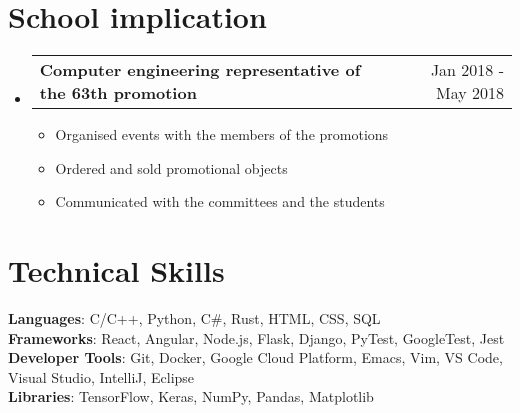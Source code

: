 \documentclass[letterpaper,11pt]{article}
\makeatletter
\newcommand{\resumeItem}[1]{
  \item\small{
    {#1}
  }
}
\newcommand{\resumeProjectHeading}[2]{
    \item
    \begin{tabular*}{0.97\textwidth}{l@{\extracolsep{\fill}}r}
      \small\textbf{#1} & #2 \\
    \end{tabular*}
}
\newcommand{\resumeSubHeadingListStart}{\begin{itemize}[leftmargin=0.15in, label={}]}
\newcommand{\resumeSubHeadingListEnd}{\end{itemize}}
\newcommand{\resumeItemListStart}{\begin{itemize}}
\newcommand{\resumeItemListEnd}{\end{itemize}}
\makeatother
\begin{document}
\section{School implication}
    \resumeSubHeadingListStart
      \resumeProjectHeading
          {Computer engineering representative of the 63th promotion}{Jan 2018 - May 2018}
          \resumeItemListStart
            \resumeItem{Organised events with the members of the promotions}
            \resumeItem{Ordered and sold promotional objects}
            \resumeItem{Communicated with the committees and the students}
          \resumeItemListEnd
    \resumeSubHeadingListEnd

%
\section{Technical Skills}
 \begin{itemize}[leftmargin=0.15in, label={}]
    \small{\item{
     \textbf{Languages}{: C/C++, Python, C\#, Rust, HTML, CSS, SQL} \\
     \textbf{Frameworks}{: React, Angular, Node.js, Flask, Django, PyTest, GoogleTest, Jest} \\
     \textbf{Developer Tools}{: Git, Docker, Google Cloud Platform, Emacs, Vim, VS Code, Visual Studio, IntelliJ, Eclipse} \\
     \textbf{Libraries}{: TensorFlow, Keras, NumPy, Pandas, Matplotlib}
    }}
 \end{itemize}


\end{document}

